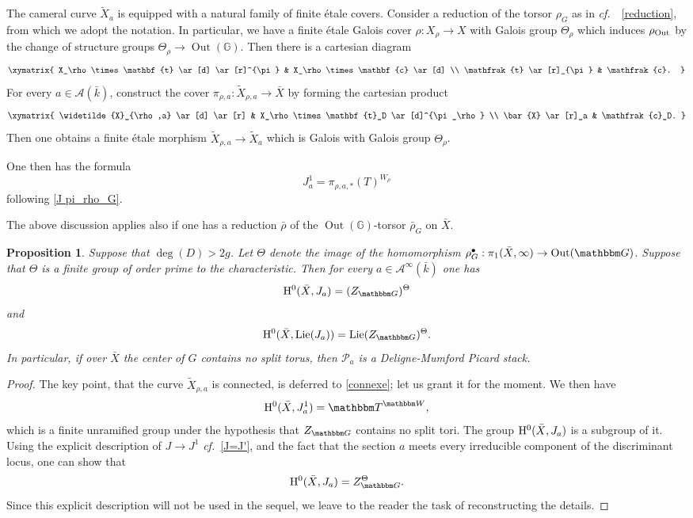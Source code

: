 \documentclass[12pt,english]{smfart}
\numberwithin{equation}{subsection}
\newtheorem{proposition}[equation]{Proposition}
\theoremstyle{remark}
\newcommand\calA{{\mathscr A}}
\newcommand\calP{{\mathscr P}}
\newcommand\GG{{\mathbbm G}}
\newcommand\bbW{{\mathbbm W}}
\newcommand\bbT{{\mathbbm T}}
\newcommand\rmH{{\rm H}}
\newcommand\Lie{{\rm Lie}}
\newcommand\Out{{\rm Out}}
\newcommand\cf{{\it cf.\ }}
\begin{document}
The cameral curve $\widetilde{X}_a$ is equipped with a natural family of finite \'etale covers.
Consider a reduction of the torsor $\rho_G$ as in \cf\ \ref{reduction}, from which we adopt the notation.
In particular, we have a finite \'etale Galois cover $\rho:X_\rho\rightarrow X$ with Galois group $\Theta_\rho$ which induces $\rho_{\Out}$ by the change of structure groups $\Theta_\rho\rightarrow \operatorname{Out}(\mathbb{G})$.
Then there is a cartesian diagram
\begin{equation}\label{diagramme deploiement 2}
\xymatrix{
X_\rho\times\mathbf{t} \ar[d] \ar[r]^{\pi} & X_\rho\times \mathbf{c} \ar[d] \\
\mathfrak{t} \ar[r]_{\pi} & \mathfrak{c}.
}
\end{equation}
For every $a\in\mathcal{A}(\bar{k})$, construct the cover
$\pi_{\rho,a}:\widetilde{X}_{\rho,a}\rightarrow \bar{X}$ by forming the cartesian product
\begin{equation}\label{tilde X rho a}
\xymatrix{
\widetilde{X}_{\rho,a} \ar[d] \ar[r] & X_\rho\times \mathbf{t}_D \ar[d]^{\pi_\rho} \\
\bar{X} \ar[r]_a & \mathfrak{c}_D.
}
\end{equation}
Then one obtains a finite \'etale morphism $\widetilde{X}_{\rho,a}\rightarrow \widetilde{X}_a$ which is Galois with Galois group $\Theta_\rho$.

One then has the formula
$$J^1_a=\pi_{\rho,a,*}(T)^{W_\rho}$$
following \ref{J pi_rho_G}.

The above discussion applies also if one has a reduction $\bar{\rho}$ of the $\operatorname{Out}(\mathbb{G})$-torsor $\bar{\rho}_G$ on $\bar{X}$.

\begin{proposition}\label{P Deligne-Mumford}
Suppose that $\deg(D)>2g$. Let $\Theta$ denote the image of the homomorphism $\rho_G^\bullet:\pi_1(\bar X,\infty)\rightarrow\Out(\GG)$. Suppose that $\Theta$ is a finite group of order prime to the characteristic. Then for every $a\in\calA^\infty(\bar k)$ one has
$$\rmH^0(\bar X,J_a)=(Z_\GG)^\Theta$$
and
$$\rmH^0(\bar X,\Lie(J_a))=\Lie(Z_\GG)^\Theta.$$
In particular, if over $\bar X$ the center of $G$ contains no split torus, then $\calP_a$ is a Deligne-Mumford Picard stack.
\end{proposition}

\begin{proof}
The key point, that the curve $\widetilde X_{\rho,a}$ is connected, is deferred to \ref{connexe}; let us grant it for the moment. We then have
$$\rmH^0(\bar X,J^1_a)=\bbT^\bbW,$$
which is a finite unramified group under the hypothesis that $Z_\GG$ contains no split tori. The group $\rmH^0(\bar X,J_a)$ is a subgroup of it. Using the explicit description of $J\rightarrow J^1$ \cf \ref{J=J'}, and the fact that the section $a$ meets every irreducible component of the discriminant locus, one can show that
$$\rmH^0(\bar X,J_a)=Z_\GG^\Theta.$$
Since this explicit description will not be used in the sequel, we leave to the reader the task of reconstructing the details.
\end{proof}
\end{document}
